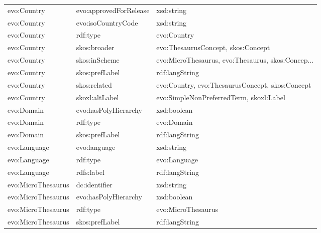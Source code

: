 \documentclass[10pt,a4paper,titlepage,final]{article}
\begin{document}
\begin{tabularx}{\textwidth}{llX}
\bottomrule
\endlastfoot
                evo:Country &  evo:approvedForRelease &                                         xsd:string \\
                evo:Country &      evo:isoCountryCode &                                         xsd:string \\
                evo:Country &                rdf:type &                                        evo:Country \\
                evo:Country &            skos:broader &                 evo:ThesaurusConcept, skos:Concept \\
                evo:Country &           skos:inScheme &  evo:MicroThesaurus, evo:Thesaurus, skos:Concep... \\
                evo:Country &          skos:prefLabel &                                     rdf:langString \\
                evo:Country &            skos:related &    evo:Country, evo:ThesaurusConcept, skos:Concept \\
                evo:Country &          skoxl:altLabel &            evo:SimpleNonPreferredTerm, skoxl:Label \\
                 evo:Domain &    evo:hasPolyHierarchy &                                        xsd:boolean \\
                 evo:Domain &                rdf:type &                                         evo:Domain \\
                 evo:Domain &          skos:prefLabel &                                     rdf:langString \\
               evo:Language &            evo:language &                                         xsd:string \\
               evo:Language &                rdf:type &                                       evo:Language \\
               evo:Language &              rdfs:label &                                     rdf:langString \\
         evo:MicroThesaurus &           dc:identifier &                                         xsd:string \\
         evo:MicroThesaurus &    evo:hasPolyHierarchy &                                        xsd:boolean \\
         evo:MicroThesaurus &                rdf:type &                                 evo:MicroThesaurus \\
         evo:MicroThesaurus &          skos:prefLabel &                                     rdf:langString \\

\end{tabularx}
\end{document}
